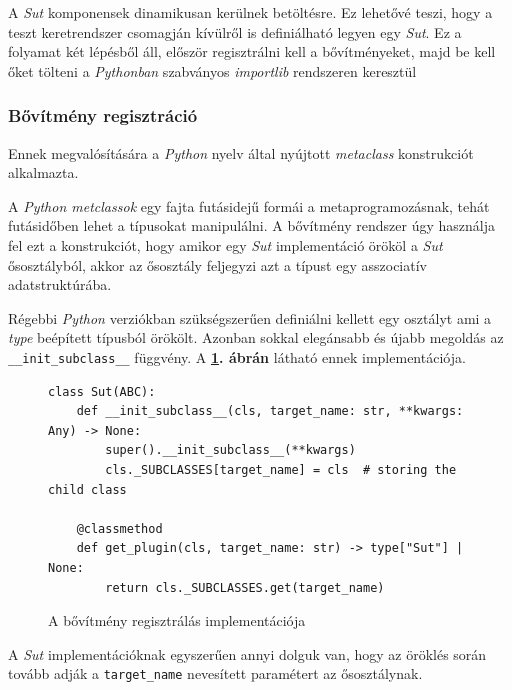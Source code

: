         A \textit{Sut} komponensek dinamikusan kerülnek betöltésre. Ez lehetővé teszi, hogy a teszt keretrendszer
        csomagján kívülről is definiálható legyen egy \textit{Sut}. Ez a folyamat két lépésből áll, először
        regisztrálni kell a bővítményeket, majd be kell őket tölteni a \textit{Pythonban} szabványos \textit{importlib}
        rendszeren keresztül

        \subsubsection{Bővítmény regisztráció}

            Ennek megvalósítására a \textit{Python} nyelv által nyújtott \textit{metaclass} konstrukciót alkalmazta.

            A \textit{Python metclassok} egy fajta futásidejű formái a metaprogramozásnak, tehát futásidőben lehet a
            típusokat manipulálni. A bővítmény rendszer úgy használja fel ezt a konstrukciót, hogy amikor egy
            \textit{Sut} implementáció örököl a \textit{Sut} ősosztályból, akkor az ősosztály feljegyzi azt a típust
            egy asszociatív adatstruktúrába.

            Régebbi \textit{Python} verziókban szükségszerűen definiálni kellett egy osztályt ami a \textit{type}
            beépített típusból örökölt. Azonban sokkal elegánsabb és újabb megoldás az \\ \verb|__init_subclass__|
            függvény. A \textbf{\ref{fig:subclass-hook}. ábrán} látható ennek implementációja.

            \begin{figure}[ht]
                \centering
                \begin{verbatim}
class Sut(ABC):
    def __init_subclass__(cls, target_name: str, **kwargs: Any) -> None:
        super().__init_subclass__(**kwargs)
        cls._SUBCLASSES[target_name] = cls  # storing the child class

    @classmethod
    def get_plugin(cls, target_name: str) -> type["Sut"] | None:
        return cls._SUBCLASSES.get(target_name)
            \end{verbatim}
                \caption{\label{fig:subclass-hook} A bővítmény regisztrálás implementációja}
            \end{figure}

            A \textit{Sut} implementációknak egyszerűen annyi dolguk van, hogy az öröklés során tovább adják a
            \verb|target_name| nevesített paramétert az ősosztálynak.

